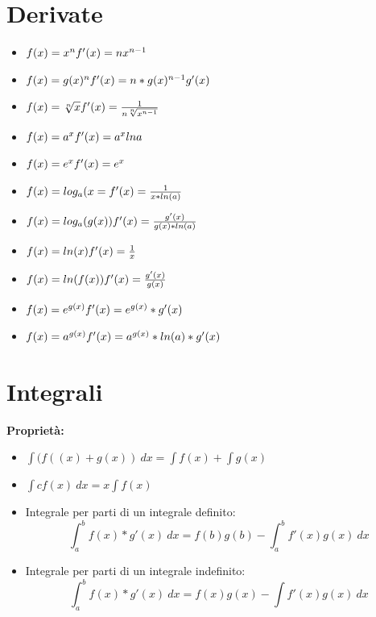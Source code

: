 \documentclass[14pt]{extreport}
\begin{document}
\section{Derivate}

\begin{itemize}
\item $f(x) = x^n \\f'(x)=nx^{n-1}$
\item $f(x) = g(x)^n \\f'(x)= n*g(x)^{n-1}g'(x)$
\item $f(x) = \sqrt[n]{x}  \\ f'(x)=\frac{1}{n\sqrt[n]{x^{n-1}}}$
\item $f(x) = a^x  \\f'(x)= a^xlna$
\item $f(x) = e^x \\f'(x)= e^x$
\item $f(x) = log_a(x= \\f'(x)= \frac{1}{x*ln(a)}$
\item $f(x) = log_a(g(x)) \\f'(x) = \frac{g'(x)}{g(x)*ln(a)}$
\item $f(x) = ln(x) \\f'(x)=\frac{1}{x}$
\item $f(x) = ln(f(x)) \\f'(x) = \frac{g'(x)}{g(x)}$
\item $f(x) = e^{g(x)} \\f'(x) = e^{g(x)}*g'(x)$
\item $f(x) = a^{g(x)} \\f'(x) = a^{g(x)}*ln(a)*g'(x)$
\end{itemize}

\section{Integrali}

\textbf{Proprietà:}

\begin{itemize}
\item $\int (f((x)+g(x)) \ dx = \int f(x) + \int g(x)$
\item $\int cf(x) \ dx =x\int f(x)$
\item Integrale per parti di un integrale definito: \\
$$\int_a^b f(x)*g'(x) \ dx = f(b)g(b) - \int_a^bf'(x)g(x) \ dx$$
\item Integrale per parti di un integrale indefinito: $$\int_a^b f(x)*g'(x) \ dx = f(x)g(x) - \int f'(x)g(x) \ dx$$
\end{itemize}
\end{document}
